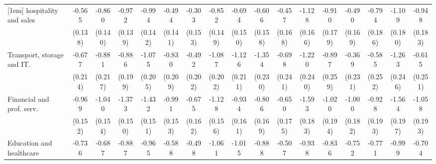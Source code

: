 {\begin{tabular}{l*{16}{c}}
[1em]
hospitality and sales&      -0.565\sym{***}&      -0.860\sym{***}&      -0.972\sym{***}&      -0.994\sym{***}&      -0.494\sym{***}&      -0.303\sym{*}  &      -0.852\sym{***}&      -0.694\sym{***}&      -0.606\sym{***}&      -0.457\sym{**} &      -1.128\sym{***}&      -0.910\sym{***}&      -0.490\sym{**} &      -0.794\sym{***}&      -1.109\sym{***}&      -0.948\sym{***}\\
                    &     (0.138)         &     (0.140)         &     (0.139)         &     (0.142)         &     (0.141)         &     (0.153)         &     (0.149)         &     (0.150)         &     (0.158)         &     (0.168)         &     (0.166)         &     (0.179)         &     (0.169)         &     (0.186)         &     (0.180)         &     (0.183)         \\
[1em]
Transport, storage and IT.&      -0.677\sym{**} &      -0.881\sym{***}&      -0.886\sym{***}&      -1.075\sym{***}&      -0.830\sym{***}&      -0.492\sym{*}  &      -1.087\sym{***}&      -1.126\sym{***}&      -1.354\sym{***}&      -0.698\sym{**} &      -1.220\sym{***}&      -0.897\sym{***}&      -0.369         &      -0.585\sym{*}  &      -1.263\sym{***}&      -0.615\sym{*}  \\
                    &     (0.214)         &     (0.217)         &     (0.199)         &     (0.205)         &     (0.209)         &     (0.202)         &     (0.202)         &     (0.211)         &     (0.230)         &     (0.241)         &     (0.240)         &     (0.259)         &     (0.231)         &     (0.252)         &     (0.246)         &     (0.251)         \\
[1em]
Financial and prof. serv.&      -0.969\sym{***}&      -1.040\sym{***}&      -1.373\sym{***}&      -1.432\sym{***}&      -0.991\sym{***}&      -0.675\sym{***}&      -1.128\sym{***}&      -0.934\sym{***}&      -0.806\sym{***}&      -0.650\sym{***}&      -1.593\sym{***}&      -1.020\sym{***}&      -1.000\sym{***}&      -0.928\sym{***}&      -1.564\sym{***}&      -1.058\sym{***}\\
                    &     (0.152)         &     (0.154)         &     (0.150)         &     (0.151)         &     (0.153)         &     (0.162)         &     (0.156)         &     (0.161)         &     (0.169)         &     (0.175)         &     (0.183)         &     (0.194)         &     (0.182)         &     (0.193)         &     (0.197)         &     (0.193)         \\
[1em]
Education and healthcare&      -0.736\sym{***}&      -0.687\sym{***}&      -0.887\sym{***}&      -0.965\sym{***}&      -0.588\sym{***}&      -0.498\sym{**} &      -1.061\sym{***}&      -1.015\sym{***}&      -0.888\sym{***}&      -0.507\sym{**} &      -0.938\sym{***}&      -0.836\sym{***}&      -0.752\sym{***}&      -0.771\sym{***}&      -0.999\sym{***}&      -0.704\sym{***}\\

\end{tabular}}
